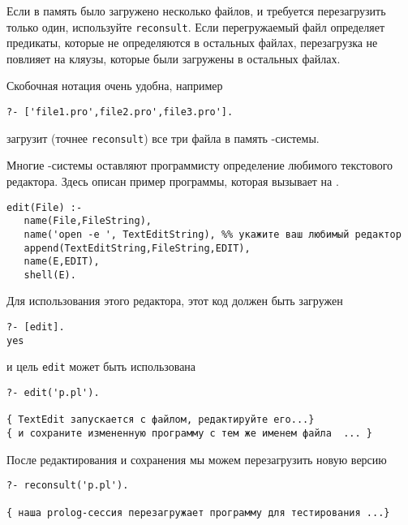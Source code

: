 Если в память было загружено несколько файлов, и требуется перезагрузить только
один, используйте \verb'reconsult'. Если перегружаемый файл определяет
предикаты, которые не определяются в остальных файлах, перезагрузка не повлияет
на кляузы, которые были загружены в остальных файлах.

Скобочная нотация очень удобна, например

\begin{verbatim}
?- ['file1.pro',file2.pro',file3.pro'].
\end{verbatim}
загрузит (точнее \verb|reconsult|) все три файла в память \prolog-системы.

Многие \prolog-системы оставляют программисту определение любимого текстового
редактора. Здесь описан пример программы, которая вызывает 
на .

\begin{verbatim}
edit(File) :- 
   name(File,FileString), 
   name('open -e ', TextEditString), %% укажите ваш любимый редактор
   append(TextEditString,FileString,EDIT),
   name(E,EDIT), 
   shell(E).
\end{verbatim}

Для использования этого редактора, этот код должен быть
загружен

\begin{verbatim}
?- [edit]. 
yes 
\end{verbatim}

и цель \verb'edit' может быть использована

\begin{verbatim}
?- edit('p.pl'). 

{ TextEdit запускается с файлом, редактируйте его...}
{ и сохраните измененную программу с тем же именем файла  ... } 
\end{verbatim}

\noindent{}

После редактирования и сохранения мы можем перезагрузить новую версию

\begin{verbatim}
?- reconsult('p.pl'). 

{ наша prolog-сессия перезагружает программу для тестирования ...}
\end{verbatim}

